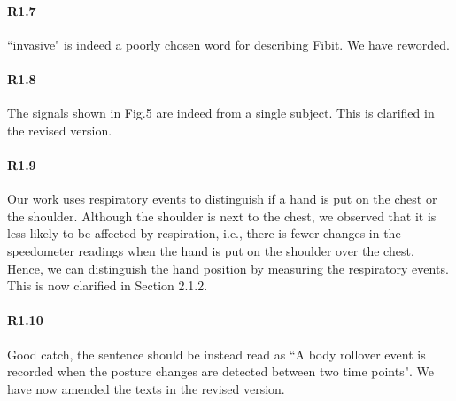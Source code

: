 \paragraph{R1.7} ``invasive" is indeed a poorly chosen word for describing Fibit. We have reworded.
\vspace{-2mm}
\paragraph{R1.8} The signals shown in Fig.5 are indeed from a single subject. This is clarified in the revised version.
\vspace{-2mm}
\paragraph{R1.9} Our work uses respiratory events to distinguish if a hand is put on the chest or the shoulder. Although the shoulder is
next to the chest, we observed that it is less likely to be affected by respiration, i.e., there is fewer changes in the speedometer
readings when the hand is put on the shoulder over the chest. Hence, we can distinguish the hand position by measuring the respiratory
events. This is now clarified in Section 2.1.2.




\paragraph{R1.10} Good catch, the sentence should be instead read as ``A body rollover event is recorded when the posture changes are detected between
two time points". We have now amended the texts in the revised version.

